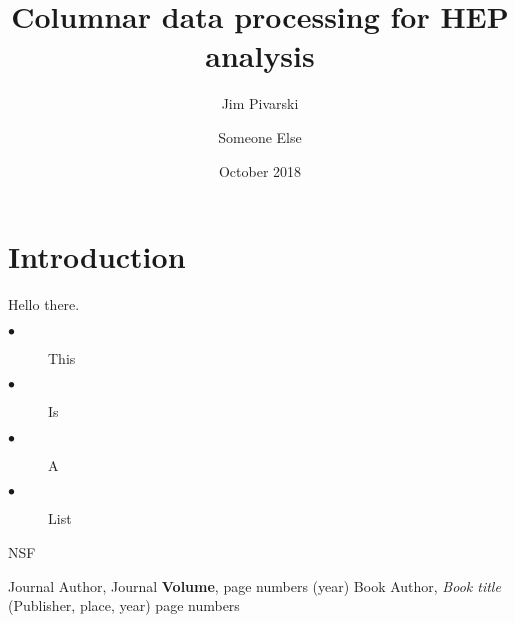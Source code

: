 \documentclass{webofc}
\title{Columnar data processing for HEP analysis}
\author{Jim Pivarski\inst{1} \and Someone Else\inst{2}}
\date{October 2018}
\begin{document}

\maketitle

\section{Introduction}

Hello there.

\begin{description}
\item[$\bullet$] This
\item[$\bullet$] Is
\item[$\bullet$] A
\item[$\bullet$] List
\end{description}

\begin{acknowledgement}
NSF
\end{acknowledgement}

\begin{thebibliography}{8}
Journal Author, Journal \textbf{Volume}, page numbers (year)
Book Author, \textit{Book title} (Publisher, place, year) page numbers
\end{thebibliography}
\end{document}
